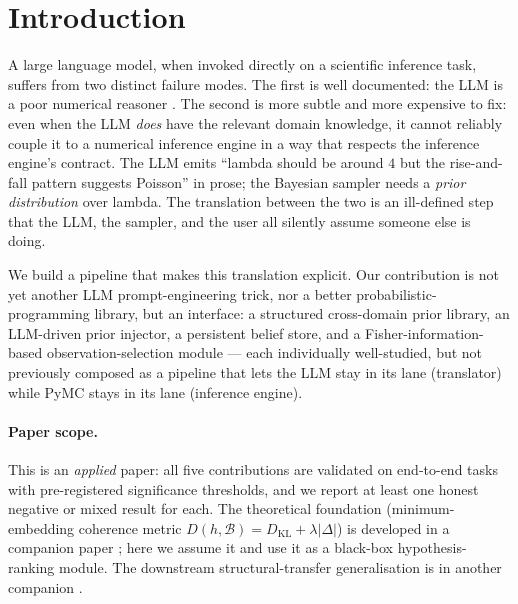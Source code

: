 \documentclass{article}
\begin{document}
\section{Introduction}
\label{sec:intro}

A large language model, when invoked directly on a scientific
inference task, suffers from two distinct failure modes. The first is
well documented: the LLM is a poor numerical
reasoner \citep{wei2022chain, lewkowycz2022minerva}. The second is
more subtle and more expensive to fix: even when the LLM
\emph{does} have the relevant domain knowledge, it cannot reliably
couple it to a numerical inference engine in a way that respects
the inference engine's contract. The LLM emits ``lambda should be
around $4$ but the rise-and-fall pattern suggests Poisson'' in prose;
the Bayesian sampler needs a \emph{prior distribution} over lambda.
The translation between the two is an ill-defined step that the
LLM, the sampler, and the user all silently assume someone else
is doing.

We build a pipeline that makes this translation explicit. Our
contribution is not yet another LLM prompt-engineering trick, nor a
better probabilistic-programming library, but an interface: a
structured cross-domain prior library, an LLM-driven prior injector,
a persistent belief store, and a Fisher-information-based
observation-selection module --- each individually well-studied,
but not previously composed as a pipeline that lets the LLM stay in
its lane (translator) while PyMC stays in its lane (inference engine).

\paragraph{Paper scope.} This is an \emph{applied} paper: all five
contributions are validated on end-to-end tasks with pre-registered
significance thresholds, and we report at least one honest negative
or mixed result for each. The theoretical foundation
(minimum-embedding coherence metric $D(h, \mathcal{B}) = D_{\mathrm{KL}}
+ \lambda |\Delta|$) is developed in a companion paper
\citep{Anonymous2026MEISPaper2}; here we assume it and use it as a
black-box hypothesis-ranking module. The downstream structural-transfer
generalisation is in another companion \citep{Anonymous2026MEISPaper3}.
\end{document}
